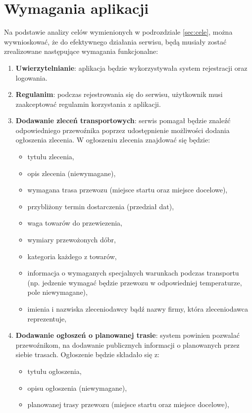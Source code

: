 \section{Wymagania aplikacji}
Na podstawie analizy celów wymienionych w podrozdziale \ref{sec:cele}, można wywnioskować, że do efektywnego działania serwisu, będą musiały zostać zrealizowane następujące wymagania funkcjonalne:
\begin{enumerate}
    \item \textbf{Uwierzytelnianie}: aplikacja będzie wykorzystywała system rejestracji oraz logowania.
    \item \textbf{Regulanim}: podczas rejestrowania się do serwisu, użytkownik musi zaakceptować regulamin korzystania z aplikacji.
    \item \textbf{Dodawanie zleceń transportowych}: serwis pomagał będzie znaleźć odpowiedniego przewoźnika poprzez udostępnienie możliwości dodania ogłoszenia zlecenia. W ogłoszeniu zlecenia znajdować się będzie:
    \begin{itemize}
        \item tytułu zlecenia,
        \item opis zlecenia (niewymagane),
        \item wymagana trasa przewozu (miejsce startu oraz miejsce docelowe),
        \item przybliżony termin dostarczenia (przedział dat),
        \item waga towarów do przewiezenia,
        \item wymiary przewożonych dóbr,
        \item kategoria każdego z towarów,
        \item informacja o wymaganych specjalnych warunkach podczas transportu (np. jedzenie wymagać będzie przewozu w odpowiedniej temperaturze, pole niewymagane),
        \item imienia i nazwiska zleceniodawcy bądź nazwy firmy, która zleceniodawca reprezentuje,
    \end{itemize}
    \item \textbf{Dodawanie ogłoszeń o planowanej trasie}: system powinien pozwalać przewoźnikom, na dodawanie publicznych informacji o planowanych przez siebie trasach. Ogłoszenie będzie składało się z:
    \begin{itemize}
        \item tytułu ogłoszenia,
        \item opisu ogłoszenia (niewymagane),
        \item planowanej trasy przewozu (miejsce startu oraz miejsce docelowe),

\end{itemize}
\end{enumerate}
